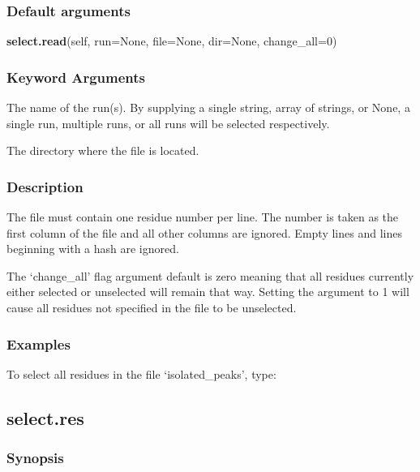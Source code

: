 \subsubsection{Default arguments}

\textsf{\textbf{select.read}(self, run=None, file=None, dir=None, change\_all=0)}


\subsubsection{Keyword Arguments}

  The name of the run(s).  By supplying a single string, array of strings, or None, a single run, multiple runs, or all runs will be selected respectively.

  The directory where the file is located.


\subsubsection{Description}

The file must contain one residue number per line.  The number is taken as the first column
of the file and all other columns are ignored.  Empty lines and lines beginning with a hash
are ignored.

The `change\_all' flag argument default is zero meaning that all residues currently either
selected or unselected will remain that way.  Setting the argument to 1 will cause all
residues not specified in the file to be unselected.


\subsubsection{Examples}

To select all residues in the file `isolated\_peaks', type:




\newpage

\subsection{select.res}


\subsubsection{Synopsis}

